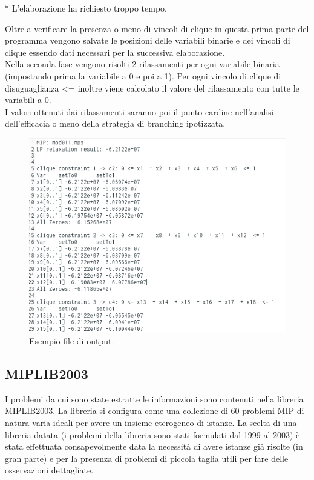 \documentclass[12pt,a4paper,twoside,openright]{book}
\begin{document}
\begin{center}
    * L'elaborazione ha richiesto troppo tempo.
\end{center}
Oltre a verificare la presenza o meno di vincoli di clique in questa prima parte del programma
vengono salvate le posizioni delle variabili binarie e dei vincoli di clique essendo dati 
necessari per la successiva elaborazione.\\ Nella seconda fase vengono risolti 2 rilassamenti 
per ogni variabile binaria (impostando prima la variabile a 0 e poi a 1). Per ogni vincolo 
di clique di disuguaglianza <= inoltre viene calcolato il valore del rilassamento con tutte le variabili a 0.\\I valori 
ottenuti dai rilassamenti saranno poi il punto cardine nell'analisi dell'efficacia o meno
della strategia di branching ipotizzata. \\
\begin{figure}[ht]
    \centering
    \includegraphics [scale = 0.5]{output_example.png}
    \caption{Esempio file di output.}
    \label{fig:output}
\end{figure}

\subsection{MIPLIB2003}
I problemi da cui sono state estratte le informazioni sono contenuti nella libreria MIPLIB2003.
La libreria si configura come una collezione di 60 problemi MIP di natura varia ideali per avere
un insieme eterogeneo di istanze. La scelta di una libreria datata (i problemi della libreria 
sono stati formulati dal 1999 al 2003) è stata effettuata consapevolmente data la necessità di avere 
istanze già risolte (in gran parte) e per la presenza di problemi di piccola taglia utili per fare 
delle osservazioni dettagliate.
\end{document}
